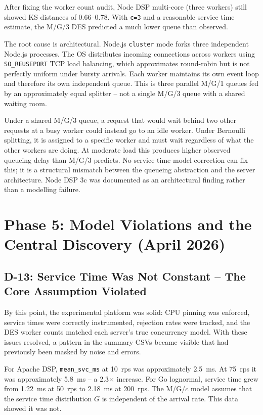 After fixing the worker count audit, Node DSP multi-core (three workers) still showed KS distances of 0.66--0.78. With \texttt{c=3} and a reasonable service time estimate, the M/G/3 DES predicted a much lower queue than observed.

The root cause is architectural. Node.js \texttt{cluster} mode forks three independent Node.js processes. The OS distributes incoming connections across workers using \texttt{SO\_REUSEPORT} TCP load balancing, which approximates round-robin but is not perfectly uniform under bursty arrivals. Each worker maintains its own event loop and therefore its own independent queue. This is three parallel M/G/1 queues fed by an approximately equal splitter -- not a single M/G/3 queue with a shared waiting room.

Under a shared M/G/3 queue, a request that would wait behind two other requests at a busy worker could instead go to an idle worker. Under Bernoulli splitting, it is assigned to a specific worker and must wait regardless of what the other workers are doing. At moderate load this produces higher observed queueing delay than M/G/3 predicts. No service-time model correction can fix this; it is a structural mismatch between the queueing abstraction and the server architecture. Node DSP 3c was documented as an architectural finding rather than a modelling failure.

\section{Phase 5: Model Violations and the Central Discovery (April 2026)}
\label{sec:journey-phase5}

\subsection{D-13: Service Time Was Not Constant -- The Core Assumption Violated}

By this point, the experimental platform was solid: CPU pinning was enforced, service times were correctly instrumented, rejection rates were tracked, and the DES worker counts matched each server's true concurrency model. With these issues resolved, a pattern in the summary CSVs became visible that had previously been masked by noise and errors.

For Apache DSP, \texttt{mean\_svc\_ms} at 10~rps was approximately 2.5~ms. At 75~rps it was approximately 5.8~ms -- a 2.3$\times$ increase. For Go lognormal, service time grew from 1.22~ms at 50~rps to 2.18~ms at 200~rps. The M/G/$c$ model assumes that the service time distribution $G$ is independent of the arrival rate. This data showed it was not.

